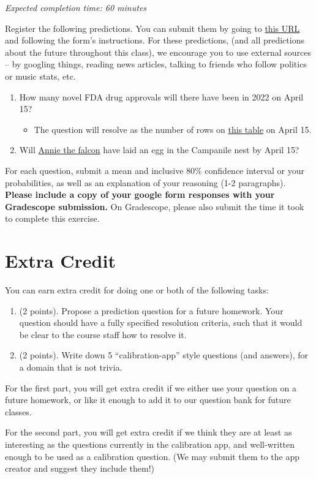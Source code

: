 \documentclass[11pt]{article}
\begin{document}
\emph{Expected completion time: 60 minutes}

Register the following predictions. You can submit them by going to \href{https://docs.google.com/forms/d/e/1FAIpQLScP_RUbXhIWJZVpTptuuzzqdGFL13aTUYLqGSIRwEXYte4Bug/viewform?usp=sf_link}{this URL} and following the form's instructions. For these predictions, (and all predictions about the future throughout this class), we encourage you to use external sources -- by googling things, reading news articles, talking to friends who follow politics or music stats, etc.

\begin{enumerate}
	\item How many novel FDA drug approvals will there have been in 2022 on April 15? 
	\begin{itemize}
		\item The question will resolve as the number of rows on \href{https://www.fda.gov/drugs/new-drugs-fda-cders-new-molecular-entities-and-new-therapeutic-biological-products/novel-drug-approvals-2022}{this table} on April 15.
	\end{itemize}
	\item Will \href{https://calfalcons.berkeley.edu/}{Annie the falcon} have laid an egg in the Campanile nest by April 15?
\end{enumerate}

For each question, submit a mean and inclusive 80\% confidence interval or your probabilities, as well as an explanation of your reasoning (1-2 paragraphs). \textbf{Please include a copy of your google form responses with your Gradescope submission.} On Gradescope, please also submit the time it took to complete this exercise.

\section*{Extra Credit}

You can earn extra credit for doing one or both of the following tasks:
\begin{enumerate}
\item (2 points). Propose a prediction question for a future homework. Your question should have a fully specified resolution criteria, 
      such that it would be clear to the course staff how to resolve it.
\item (2 points). Write down 5 ``calibration-app'' style questions (and answers), for a domain that is not trivia.
\end{enumerate}

For the first part, you will get extra credit if we either use your question on a future homework, 
or like it enough to add it to our question bank for future classes.

For the second part, you will get extra credit if we think they are at least as interesting as the 
questions currently in the calibration app, and well-written enough to be used as a calibration question. 
(We may submit them to the app creator and suggest they include them!)
\end{document}

